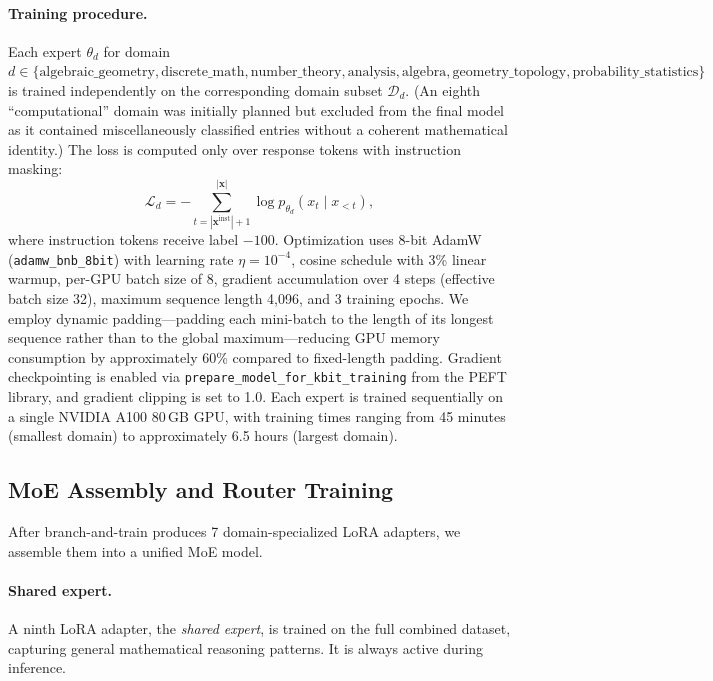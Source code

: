 \documentclass[11pt,a4paper]{article}
\begin{document}
\paragraph{Training procedure.}
Each expert $\theta_d$ for domain $d \in \{\text{algebraic\_geometry}, \text{discrete\_math}, \text{number\_theory}, \text{analysis}, \text{algebra}, \text{geometry\_topology}, \text{probability\_statistics}\}$ is trained independently on the corresponding domain subset $\mathcal{D}_d$. (An eighth ``computational'' domain was initially planned but excluded from the final model as it contained miscellaneously classified entries without a coherent mathematical identity.) The loss is computed only over response tokens with instruction masking:
\begin{equation}
\mathcal{L}_d = -\sum_{t=|\boldsymbol{x}^{\text{inst}}|+1}^{|\boldsymbol{x}|} \log p_{\theta_d}(x_t \mid x_{<t}),
\label{eq:expert_loss}
\end{equation}
where instruction tokens receive label $-100$. Optimization uses 8-bit AdamW (\texttt{adamw\_bnb\_8bit}) with learning rate $\eta = 10^{-4}$, cosine schedule with 3\% linear warmup, per-GPU batch size of 8, gradient accumulation over 4 steps (effective batch size 32), maximum sequence length 4,096, and 3 training epochs. We employ dynamic padding---padding each mini-batch to the length of its longest sequence rather than to the global maximum---reducing GPU memory consumption by approximately 60\% compared to fixed-length padding. Gradient checkpointing is enabled via \texttt{prepare\_model\_for\_kbit\_training} from the PEFT library, and gradient clipping is set to 1.0. Each expert is trained sequentially on a single NVIDIA A100 80\,GB GPU, with training times ranging from 45 minutes (smallest domain) to approximately 6.5 hours (largest domain).

\subsection{MoE Assembly and Router Training}
\label{sec:moe_assembly}

After branch-and-train produces 7 domain-specialized LoRA adapters, we assemble them into a unified MoE model.

\paragraph{Shared expert.}
A ninth LoRA adapter, the \emph{shared expert}, is trained on the full combined dataset, capturing general mathematical reasoning patterns. It is always active during inference.
\end{document}
